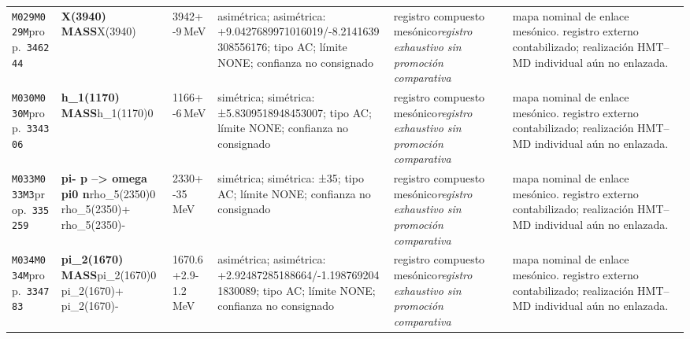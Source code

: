 \begin{landscape}
\begin{longtable}{L{1.85cm}L{4.45cm}L{2.35cm}L{4.05cm}L{3.35cm}L{7.15cm}}
\texttt{M029}\newline \texttt{M029M}\newline prop.\ \texttt{346244} & \textbf{X(3940) MASS}\newline X(3940) & 3942+-9\,MeV & asimétrica; asimétrica: +9.0427689971016019/-8.2141639308556176; tipo AC; límite NONE; confianza no consignado & registro compuesto mesónico\newline \emph{registro exhaustivo sin promoción comparativa} & mapa nominal de enlace mesónico. registro externo contabilizado; realización HMT--MD individual aún no enlazada. \\
\texttt{M030}\newline \texttt{M030M}\newline prop.\ \texttt{334306} & \textbf{h\_\allowbreak{}1(1170) MASS}\newline h\_\allowbreak{}1(1170)0 & 1166+-6\,MeV & simétrica; simétrica: ±5.8309518948453007; tipo AC; límite NONE; confianza no consignado & registro compuesto mesónico\newline \emph{registro exhaustivo sin promoción comparativa} & mapa nominal de enlace mesónico. registro externo contabilizado; realización HMT--MD individual aún no enlazada. \\
\texttt{M033}\newline \texttt{M033M3}\newline prop.\ \texttt{335259} & \textbf{pi- p --\textgreater{} omega pi0 n}\newline rho\_\allowbreak{}5(2350)0 \textbar{}\allowbreak{} rho\_\allowbreak{}5(2350)+ \textbar{}\allowbreak{} rho\_\allowbreak{}5(2350)- & 2330+-35\,MeV & simétrica; simétrica: ±35; tipo AC; límite NONE; confianza no consignado & registro compuesto mesónico\newline \emph{registro exhaustivo sin promoción comparativa} & mapa nominal de enlace mesónico. registro externo contabilizado; realización HMT--MD individual aún no enlazada. \\
\texttt{M034}\newline \texttt{M034M}\newline prop.\ \texttt{334783} & \textbf{pi\_\allowbreak{}2(1670) MASS}\newline pi\_\allowbreak{}2(1670)0 \textbar{}\allowbreak{} pi\_\allowbreak{}2(1670)+ \textbar{}\allowbreak{} pi\_\allowbreak{}2(1670)- & 1670.6+2.9-1.2\,MeV & asimétrica; asimétrica: +2.92487285188664/-1.1987692041830089; tipo AC; límite NONE; confianza no consignado & registro compuesto mesónico\newline \emph{registro exhaustivo sin promoción comparativa} & mapa nominal de enlace mesónico. registro externo contabilizado; realización HMT--MD individual aún no enlazada. \\

\end{longtable}
\end{landscape}
